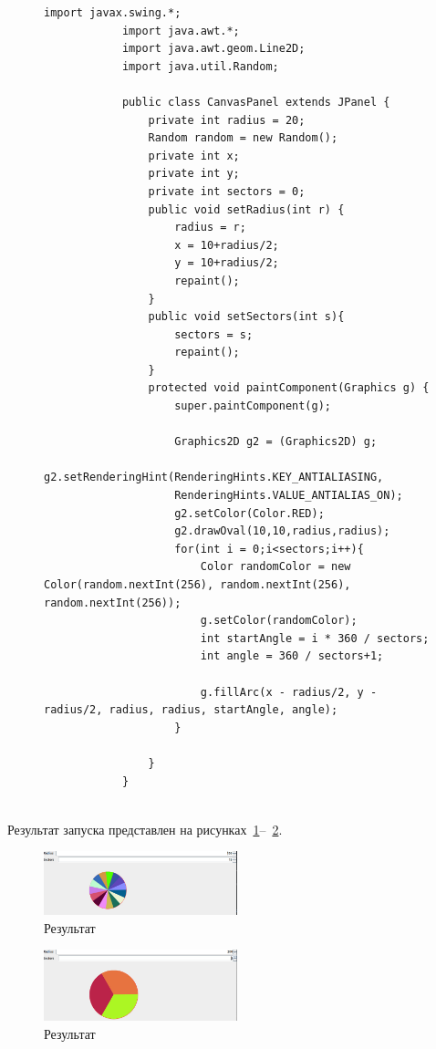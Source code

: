 \documentclass[a4paper, 14pt]{extarticle}
\begin{document}
	\begin{figure}[!htb]
		\begin{lstlisting}[language={},caption={Класс CanvasPanel},label={lst:code2}]
			import javax.swing.*;
			import java.awt.*;
			import java.awt.geom.Line2D;
			import java.util.Random;
			
			public class CanvasPanel extends JPanel {
				private int radius = 20;
				Random random = new Random();
				private int x;
				private int y;
				private int sectors = 0;
				public void setRadius(int r) {
					radius = r;
					x = 10+radius/2;
					y = 10+radius/2;
					repaint();
				}
				public void setSectors(int s){
					sectors = s;
					repaint();
				}
				protected void paintComponent(Graphics g) {
					super.paintComponent(g);
					
					Graphics2D g2 = (Graphics2D) g;
					g2.setRenderingHint(RenderingHints.KEY_ANTIALIASING,
					RenderingHints.VALUE_ANTIALIAS_ON);
					g2.setColor(Color.RED);
					g2.drawOval(10,10,radius,radius);
					for(int i = 0;i<sectors;i++){
						Color randomColor = new Color(random.nextInt(256), random.nextInt(256), random.nextInt(256));
						g.setColor(randomColor);
						int startAngle = i * 360 / sectors;
						int angle = 360 / sectors+1;
						
						g.fillArc(x - radius/2, y - radius/2, radius, radius, startAngle, angle);
					}
					
				}
			}
			
			\end{lstlisting}
		\end{figure}
		
		Результат запуска представлен на рисунках~\ref{fig:img1}--~\ref{fig:img2}.
		
		\begin{figure}[!htb]
			\centering
			\includegraphics[width=0.5\textwidth]{img1}
			\caption{Результат}
			\label{fig:img1}
		\end{figure}
		\begin{figure}[!htb]
			\centering
			\includegraphics[width=0.5\textwidth]{img2}
			\caption{Результат}
			\label{fig:img2}
		\end{figure}
		
	
\end{document}
